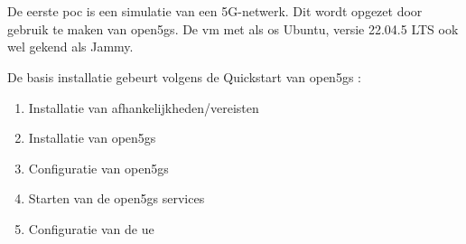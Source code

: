 \chapter{}%
\label{ch:poc1}

De eerste \gls{poc} is een simulatie van een 5G-netwerk. Dit wordt opgezet door gebruik te maken van \gls{open5gs}. De \gls{vm} met als \gls{os} Ubuntu, versie 22.04.5 LTS ook wel gekend als Jammy.

De basis installatie gebeurt volgens de Quickstart van \gls{open5gs} \textcite{Lee2025a}:

\begin{enumerate}
    \item Installatie van afhankelijkheden/vereisten
    \item Installatie van \gls{open5gs}
    \item Configuratie van \gls{open5gs}
    \item Starten van de \gls{open5gs} services
    \item Configuratie van de \gls{ue}
\end{enumerate}
